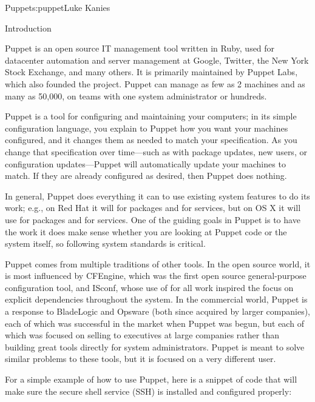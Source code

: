 \begin{aosachapter}{Puppet}{s:puppet}{Luke Kanies}


\begin{aosasect1}{Introduction}

Puppet is an open source IT management tool written in Ruby, used for
datacenter automation and server management at Google, Twitter, the
New York Stock Exchange, and many others. It is primarily maintained
by Puppet Labs, which also founded the project.  Puppet can manage as
few as 2 machines and as many as 50,000, on teams with one system
administrator or hundreds.

Puppet is a tool for configuring and maintaining your computers; in
its simple configuration language, you explain to Puppet how you want
your machines configured, and it changes them as needed to match your
specification.  As you change that specification over time---such as
with package updates, new users, or configuration updates---Puppet
will automatically update your machines to match.  If they are already
configured as desired, then Puppet does nothing.

In general, Puppet does everything it can to use existing system
features to do its work; e.g., on Red Hat it will  for packages and
 for services, but on OS X it will use  for packages and
 for services.  One of the guiding goals in Puppet is to have
the work it does make sense whether you are looking at Puppet code or
the system itself, so following system standards is critical.

Puppet comes from multiple traditions of other tools.  In the open
source world, it is most influenced by CFEngine, which was the first
open source general-purpose configuration tool, and ISconf, whose use
of  for all work inspired the focus on explicit dependencies
throughout the system.  In the commercial world, Puppet is a response
to BladeLogic and Opsware (both since acquired by larger companies),
each of which was successful in the market when Puppet was begun, but
each of which was focused on selling to executives at large companies
rather than building great tools directly for system administrators.
Puppet is meant to solve similar problems to these tools, but it is
focused on a very different user.

For a simple example of how to use Puppet, here is a snippet of code
that will make sure the secure shell service (SSH) is installed and
configured properly:


\end{aosasect1}
\end{aosachapter}
